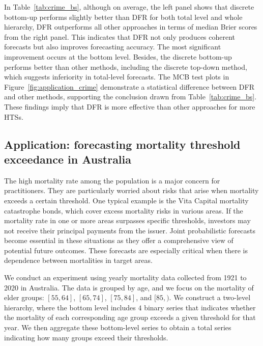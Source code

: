 \documentclass[a4paper,review,12pt,authoryear]{elsarticle}
\begin{document}
     In Table~\ref{tab:crime_bs},  although on average, the left panel shows that discrete bottom-up performs slightly better than DFR for both total level and whole hierarchy, DFR outperforms all other approaches in terms of median Brier scores from the right panel. This indicates that DFR not only produces coherent forecasts but also improves forecasting accuracy. The most significant improvement occurs at the bottom level. Besides, the discrete bottom-up performs better than other methods, including the discrete top-down method, which suggests inferiority in total-level forecasts. The MCB test plots in Figure~\ref{fig:application_crime} demonstrate a statistical difference between DFR and other methods, supporting the conclusion drawn from Table~\ref{tab:crime_bs}. These findings imply that DFR is more effective than other approaches for more HTSs.

     \subsection{Application: forecasting mortality threshold exceedance in Australia}
     \label{sec:application_mortality}
     The high mortality rate among the population is a major concern for practitioners.
     They are particularly worried about risks that arise when mortality exceeds a certain threshold.
     One typical example is the Vita Capital mortality catastrophe bonds, which cover excess mortality risks in various areas.
     If the mortality rate in one or more areas surpasses specific thresholds, investors may not receive their principal payments from the issuer.
     Joint probabilistic forecasts become essential in these situations as they offer a comprehensive view of potential future outcomes.
     These forecasts are especially critical when there is dependence between mortalities in target areas.

     We conduct an experiment using yearly mortality data collected from 1921 to 2020 in Australia.
     The data is grouped by age, and we focus on the mortality of elder groups: $[55, 64]$, $[65, 74]$, $[75, 84]$, and $[85, )$.
     We construct a two-level hierarchy, where the bottom level includes
     $4$ binary series that indicates whether the mortality of each corresponding age group exceeds a given threshold for that year.
     We then aggregate these bottom-level series to obtain a total series indicating how many groups exceed their thresholds.
\end{document}
